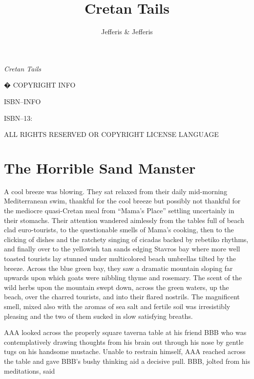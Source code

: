 \documentclass[10pt,twoside,openright]{memoir}
\author{Jefferis \& Jefferis}
\title{Cretan Tails}
\date{}
\makeatletter
\def\maketitle{%
  \null
  \thispagestyle{empty}%
  \vfill
  \begin{center}\leavevmode
    \normalfont
    {\LARGE\raggedleft \@author\par}%
    \hrulefill\par
    {\huge\raggedright \@title\par}%
    \vskip 1cm
  \end{center}%
  \vfill
  \null
  \cleardoublepage
  }
\makeatother
\begin{document}
\let\cleardoublepage\clearpage
\maketitle
\frontmatter
\null\vfill
\begin{flushleft}
\textit{Cretan Tails}

� COPYRIGHT INFO

ISBN--INFO

ISBN--13: 
\bigskip

ALL RIGHTS RESERVED OR COPYRIGHT LICENSE LANGUAGE

\end{flushleft}

\newpage
\tableofcontents

\let\cleardoublepage\clearpage
\mainmatter
\sloppy


\chapter{The Horrible Sand Manster}

A cool breeze was blowing. They sat relaxed from their daily mid-morning Mediterranean swim, thankful for the cool breeze but possibly not thankful for the mediocre quasi-Cretan meal from ``Mama's Place'' settling uncertainly in their stomachs. Their attention wandered aimlessly from the tables full of beach clad euro-tourists, to the questionable smells of Mama's cooking, then to the clicking of dishes and the ratchety singing of cicadas backed by rebetiko rhythms, and finally over to the yellowish tan sands edging Stavros bay where more well toasted tourists lay stunned under multicolored beach umbrellas tilted by the breeze. Across the blue green bay, they saw a dramatic mountain sloping far upwards upon which goats were nibbling thyme and rosemary. The scent of the wild herbs upon the mountain swept down, across the green waters, up the beach, over the charred tourists, and into their flared nostrils. The magnificent smell, mixed also with the aromas of sea salt and fertile soil was irresistibly pleasing and the two of them sucked in slow satisfying breaths.

AAA looked across the properly square taverna table at his friend BBB who was contemplatively drawing thoughts from his brain out through his nose by gentle tugs on his handsome mustache. Unable to restrain himself, AAA reached across the table and gave BBB's bushy thinking aid a decisive pull. BBB, jolted from his meditations, said 
\end{document}
